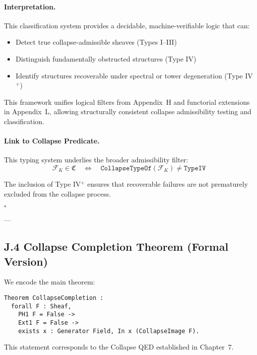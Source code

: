 \documentclass[11pt]{article}
\begin{document}
\medskip

\paragraph{Interpretation.}

This classification system provides a decidable, machine-verifiable logic that can:

\begin{itemize}
  \item Detect true collapse-admissible sheaves (Types I–III)
  \item Distinguish fundamentally obstructed structures (Type IV)
  \item Identify structures recoverable under spectral or tower degeneration (Type IV$^+$)
\end{itemize}

This framework unifies logical filters from Appendix~H and functorial extensions in Appendix~L, allowing structurally consistent collapse admissibility testing and classification.

\medskip

\paragraph{Link to Collapse Predicate.}

This typing system underlies the broader admissibility filter:
\[
\mathcal{F}_K \in \mathfrak{C} \quad \Leftrightarrow \quad \texttt{CollapseTypeOf}(\mathcal{F}_K) \ne \texttt{TypeIV}
\]

The inclusion of Type IV$^+$ ensures that recoverable failures are not prematurely excluded from the collapse process.

\hfill $\square$


---

\subsection*{J.4 Collapse Completion Theorem (Formal Version)}

We encode the main theorem:

\begin{lstlisting}[language=Coq, caption={Coq: Collapse Completion Theorem}]
Theorem CollapseCompletion :
  forall F : Sheaf,
    PH1 F = False ->
    Ext1 F = False ->
    exists x : Generator Field, In x (CollapseImage F).
\end{lstlisting}

This statement corresponds to the Collapse QED established in Chapter~7.
\end{document}

